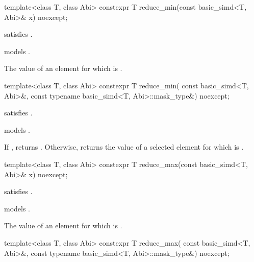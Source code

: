 \begin{itemdecl}
template<class T, class Abi> constexpr T reduce_min(const basic_simd<T, Abi>& x) noexcept;
\end{itemdecl}

\begin{itemdescr}
  \pnum\constraints
   satisfies .

  \pnum\expects
   models .

  \pnum\returns
  The value of an element  for which  is  \foralli.
\end{itemdescr}

\begin{itemdecl}
template<class T, class Abi>
  constexpr T reduce_min(
    const basic_simd<T, Abi>&, const typename basic_simd<T, Abi>::mask_type&) noexcept;
\end{itemdecl}

\begin{itemdescr}
  \pnum\constraints
   satisfies .

  \pnum\expects
   models .

  \pnum\returns
  If , returns .
  Otherwise, returns the value of a selected element  for which  is  \forallmaskedi.
\end{itemdescr}

\begin{itemdecl}
template<class T, class Abi> constexpr T reduce_max(const basic_simd<T, Abi>& x) noexcept;
\end{itemdecl}

\begin{itemdescr}
  \pnum\constraints
   satisfies .

  \pnum\expects
   models .

  \pnum\returns
  The value of an element  for which  is  \foralli.
\end{itemdescr}

\begin{itemdecl}
template<class T, class Abi>
  constexpr T reduce_max(
    const basic_simd<T, Abi>&, const typename basic_simd<T, Abi>::mask_type&) noexcept;
\end{itemdecl}

